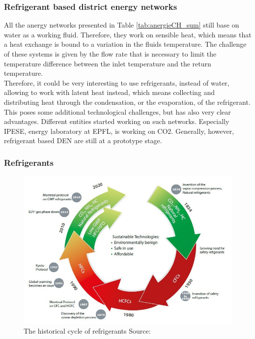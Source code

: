 \documentclass{article}
\begin{document}
\subsubsection{Refrigerant based district energy networks}
All the anergy networks presented in Table \ref{tab:anergieCH_sum} still base on water as a working fluid. Therefore, they work on sensible heat, which means that a heat exchange is bound to a variation in the fluids temperature. The challenge of these systems is given by the flow rate that is necessary to limit the temperature difference between the inlet temperature and the return temperature.\\
Therefore, it could be very interesting to use refrigerants, instead of water, allowing to work with latent heat instead, which means collecting and distributing heat through the condensation, or the evaporation, of the refrigerant. This poses some additional technological challenges, but has also very clear advantages.
Different entities started working on such networks. Especially IPESE, energy laboratory at EPFL, is working on CO2. Generally, however, refrigerant based DEN are still at a prototype stage.

\subsubsection{Refrigerants}

\begin{figure}[h!]
\centering
\includegraphics[width=1\textwidth]{refrigerants.JPG}
\caption{The historical cycle of refrigerants Source: \cite{danfossRefrigerantOptionsNow2017}}
\label{fig:refrigerants}
\end{figure}
\end{document}
